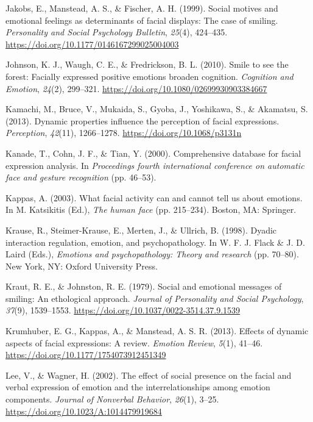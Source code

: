 \documentclass[
  english,
  doc]{apa7}
\newlength{\cslhangindent}
\newenvironment{cslreferences}%
  {\setlength{\parindent}{0pt}%
  \everypar{\setlength{\hangindent}{\cslhangindent}}\ignorespaces}%
  {\par}
\begin{document}
\begin{cslreferences}
\leavevmode\hypertarget{ref-jakobs1999social}{}%
Jakobs, E., Manstead, A. S., \& Fischer, A. H. (1999). Social motives and emotional feelings as determinants of facial displays: The case of smiling. \emph{Personality and Social Psychology Bulletin}, \emph{25}(4), 424--435. \url{https://doi.org/10.1177/0146167299025004003}

\leavevmode\hypertarget{ref-johnson2010smile}{}%
Johnson, K. J., Waugh, C. E., \& Fredrickson, B. L. (2010). Smile to see the forest: Facially expressed positive emotions broaden cognition. \emph{Cognition and Emotion}, \emph{24}(2), 299--321. \url{https://doi.org/10.1080/02699930903384667}

\leavevmode\hypertarget{ref-kamachi2013dynamic}{}%
Kamachi, M., Bruce, V., Mukaida, S., Gyoba, J., Yoshikawa, S., \& Akamatsu, S. (2013). Dynamic properties influence the perception of facial expressions. \emph{Perception}, \emph{42}(11), 1266--1278. \url{https://doi.org/10.1068/p3131n}

\leavevmode\hypertarget{ref-kanade2000comprehensive}{}%
Kanade, T., Cohn, J. F., \& Tian, Y. (2000). Comprehensive database for facial expression analysis. In \emph{Proceedings fourth international conference on automatic face and gesture recognition} (pp. 46--53).

\leavevmode\hypertarget{ref-kappas2003facial}{}%
Kappas, A. (2003). What facial activity can and cannot tell us about emotions. In M. Katsikitis (Ed.), \emph{The human face} (pp. 215--234). Boston, MA: Springer.

\leavevmode\hypertarget{ref-krause1998dyadic}{}%
Krause, R., Steimer-Krause, E., Merten, J., \& Ullrich, B. (1998). Dyadic interaction regulation, emotion, and psychopathology. In W. F. J. Flack \& J. D. Laird (Eds.), \emph{Emotions and psychopathology: Theory and research} (pp. 70--80). New York, NY: Oxford University Press.

\leavevmode\hypertarget{ref-kraut1979social}{}%
Kraut, R. E., \& Johnston, R. E. (1979). Social and emotional messages of smiling: An ethological approach. \emph{Journal of Personality and Social Psychology}, \emph{37}(9), 1539--1553. \url{https://doi.org/10.1037/0022-3514.37.9.1539}

\leavevmode\hypertarget{ref-krumhuber2013effects}{}%
Krumhuber, E. G., Kappas, A., \& Manstead, A. S. R. (2013). Effects of dynamic aspects of facial expressions: A review. \emph{Emotion Review}, \emph{5}(1), 41--46. \url{https://doi.org/10.1177/1754073912451349}

\leavevmode\hypertarget{ref-lee2002effect}{}%
Lee, V., \& Wagner, H. (2002). The effect of social presence on the facial and verbal expression of emotion and the interrelationships among emotion components. \emph{Journal of Nonverbal Behavior}, \emph{26}(1), 3--25. \url{https://doi.org/10.1023/A:1014479919684}


\end{cslreferences}
\end{document}
